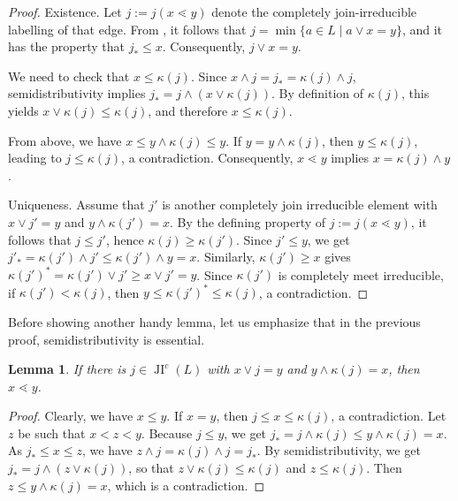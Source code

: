 \documentclass{amsart}
\theoremstyle{thmstyle}
\newtheorem{lemma}[thm]{Lemma}
\theoremstyle{exstyle}
\theoremstyle{defstyle}
\theoremstyle{remstyle}
\theoremstyle{remstyle}
\DeclareMathOperator*{\JI}{JI}
\begin{document}
\begin{proof}
    Existence. Let $j:=j(x \lessdot y)$ denote the completely join-irreducible labelling of that edge. From \cite[Lemma 3.11]{RST}, it follows that $j=\min \{a \in L \mid a \vee x = y\}$, and it has the property that $j_* \le x$. Consequently, $j \vee x = y$.

    We need to check that $x \le \kappa(j)$. Since $x \wedge j = j_* = \kappa(j) \wedge j$, semidistributivity implies $j_* = j \wedge (x \vee \kappa(j))$. By definition of $\kappa(j)$, this yields $x \vee \kappa(j) \leq \kappa(j)$, and therefore $x \leq \kappa(j)$.

    From above, we have $x \leq y \wedge \kappa(j) \leq y$. If $y = y \wedge \kappa(j)$, then $y \le \kappa(j)$, leading to $j \leq \kappa(j)$, a contradiction. Consequently, $x \lessdot y$ implies $x = \kappa(j)\wedge y$.

    Uniqueness. Assume that $j'$ is another completely join irreducible element with $x \vee j' = y$ and $y \wedge \kappa(j')=x$. By the defining property of $j:= j(x \lessdot y)$, it follows that $j \le j'$, hence $\kappa(j) \ge \kappa(j')$. Since $j' \le y$, we get $j'_*=\kappa(j') \wedge j' \le \kappa(j') \wedge y = x$. Similarly, $\kappa(j') \ge x$ gives $\kappa(j')^*=\kappa(j') \vee j' \ge x \vee j' = y$. 
    Since $\kappa(j')$ is completely meet irreducible, if $\kappa(j') < \kappa(j)$, then $y \le \kappa(j')^* \le \kappa(j)$, a contradiction.    
\end{proof}

Before showing another handy lemma, let us emphasize that in the previous proof, semidistributivity is essential.

\begin{lemma}\label{Lem: join-irr cover relation}
    If there is $j \in \JI^c(L)$ with $x \vee j = y$ and $y \wedge \kappa(j)=x$, then $x \lessdot y$.
\end{lemma}

\begin{proof}
Clearly, we have $x \le y$. If $x = y$, then $j \le x \le \kappa(j)$, a contradiction. Let $z$ be such that $x < z < y$. Because $j \le y$, we get $j_*=j \wedge \kappa(j) \le y \wedge \kappa(j) = x$. As $j_* \le x \le z$, we have $z \wedge j = \kappa(j) \wedge j = j_*$. By semidistributivity, we get $j_* = j \wedge (z \vee \kappa(j))$, so that $z \vee \kappa(j) \le \kappa(j)$ and $z \le \kappa(j)$. Then $z \le y \wedge \kappa(j) = x$, which is a contradiction.
\end{proof}
\end{document}
